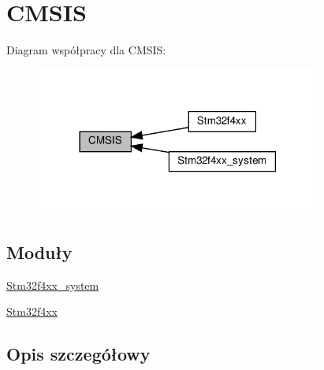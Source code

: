 \hypertarget{group___c_m_s_i_s}{}\section{C\+M\+S\+IS}
\label{group___c_m_s_i_s}
Diagram współpracy dla C\+M\+S\+IS\+:\nopagebreak
\begin{figure}[H]
\begin{center}
\leavevmode
\includegraphics[width=266pt]{group___c_m_s_i_s}
\end{center}
\end{figure}
\subsection*{Moduły}
\begin{DoxyCompactItemize}
\item 
\hyperlink{group__stm32f4xx__system}{Stm32f4xx\+\_\+system}
\item 
\hyperlink{group__stm32f4xx}{Stm32f4xx}
\end{DoxyCompactItemize}


\subsection{Opis szczegółowy}
